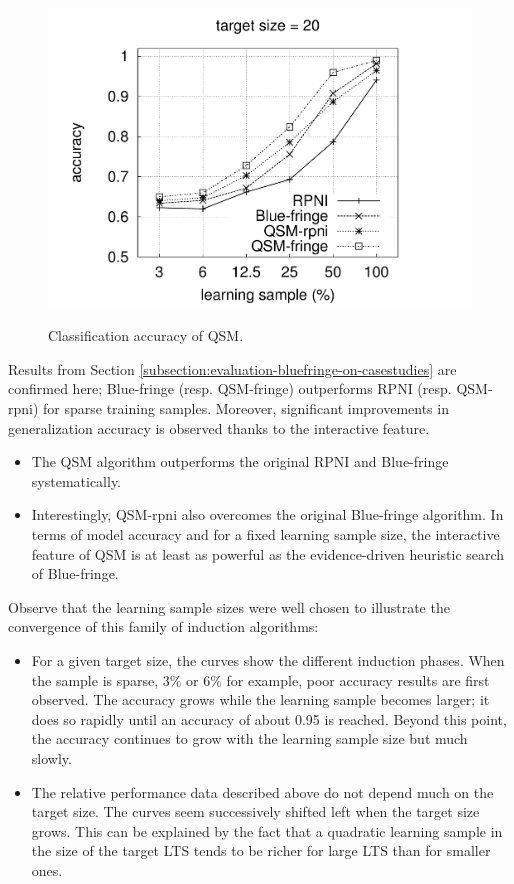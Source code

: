 \begin{figure}[t]
{  \includegraphics[trim=30mm 0mm 35mm 0mm, clip, page=4]{src/5-evaluation/images/accuracy}
}
\caption{Classification accuracy of QSM\label{image:evaluation-qsm-accuracy}.}
\end{figure}

Results from Section \ref{subsection:evaluation-bluefringe-on-casestudies} are confirmed here; Blue-fringe (resp. QSM-fringe) outperforms RPNI (resp. QSM-rpni) for sparse training samples. Moreover, significant improvements in generalization accuracy is observed thanks to the interactive feature.
\begin{itemize}
\item The QSM algorithm outperforms the original RPNI and Blue-fringe systematically.
\item Interestingly, QSM-rpni also overcomes the original Blue-fringe algorithm. In terms of model accuracy and for a fixed learning sample size, the interactive feature of QSM is at least as powerful as the evidence-driven heuristic search of Blue-fringe.
\end{itemize}

Observe that the learning sample sizes were well chosen to illustrate the convergence of this family of induction algorithms:
\begin{itemize}
\item For a given target size, the curves show the different induction phases. When the sample is sparse, 3\% or 6\% for example, poor accuracy results are first observed. The accuracy grows while the learning sample becomes larger; it does so rapidly until an accuracy of about 0.95 is reached. Beyond this point, the accuracy continues to grow with the learning sample size but much slowly. 
\item The relative performance data described above do not depend much on the target size. The curves seem successively shifted left when the target size grows. This can be explained by the fact that a quadratic learning sample in the size of the target LTS tends to be richer for large LTS than for smaller ones. 
\end{itemize}

